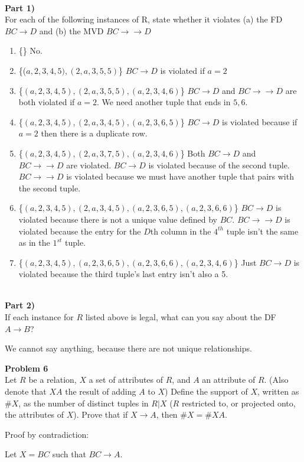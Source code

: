 \documentclass[12pt,letter]{article}
\newcommand{\problem}[1]{\vspace{3mm}\Large\textbf{{Problem
{#1}\vspace{3mm}}}\normalsize\\}
\newcommand{\ppart}[1]{\vspace{2mm}\large\textbf{\\Part
{#1})\vspace{2mm}}\normalsize\\}
\begin{document}
\ppart{1}
For each of the following instances of R, state whether it violates (a) the FD
$BC\rightarrow D$ and (b) the MVD $BC\rightarrow\rightarrow D$
\begin{enumerate}[label=(\alph*)]
    \item \{\}  
        No. 
    \item \{($a,2,3,4,5),(2,a,3,5,5)$\} 
        $BC\rightarrow D$ is violated if $a=2$
    \item \{$(a,2,3,4,5),(2,a,3,5,5),(a,2,3,4,6)$\} $BC\rightarrow D$ and
        $BC\rightarrow\rightarrow D$ are both violated if $a=2$. We need another
        tuple that ends in $5,6$.
    \item \{$(a,2,3,4,5),(2,a,3,4,5),(a,2,3,6,5)$\}
        $BC\rightarrow D$ is violated because if $a=2$ then there is a duplicate
        row.
    \item \{$(a,2,3,4,5), (2,a,3,7,5), (a,2,3,4,6)$\}
        Both $BC\rightarrow D$ and $BC\rightarrow\rightarrow D$ are violated.
        $BC\rightarrow D$ is violated because of the second tuple.
        $BC\rightarrow\rightarrow D$ is violated because we must have another
        tuple that pairs with the second tuple.
    \item \{$(a,2,3,4,5),(2,a,3,4,5), (a,2,3,6,5), (a,2,3,6,6)$\}
        $BC\rightarrow D$ is violated because there is not a unique value
        defined by $BC$. $BC\rightarrow\rightarrow D$ is violated because the
        entry for the $D$th column in the $4^{th}$ tuple isn't the same as in
        the $1^{st}$ tuple.
    \item \{$(a,2,3,4,5),(a,2,3,6,5),(a,2,3,6,6),(a,2,3,4,6)$\}
        Just $BC\rightarrow D$ is violated because the third tuple's last entry
        isn't also a 5.
\end{enumerate}

\ppart{2}
If each instance for $R$ listed above is legal, what can you say about the DF $A
\rightarrow B$?

We cannot say anything, because there are not unique relationships.

\problem{6}
Let $R$ be a relation, $X$ a set of attributes of $R$, and $A$ an attribute of
$R$. (Also denote that $XA$ the result of adding $A$ to $X$) Define the support
of $X$, written as $\#X$, as the number of distinct tuples in $R|X$ ($R$
restricted to, or projected onto, the attributes of $X$). Prove that if $X
\rightarrow A$, then $\#X = \#XA$.

Proof by contradiction:

Let $X = BC$ such that $BC\rightarrow A$.
\end{document}
